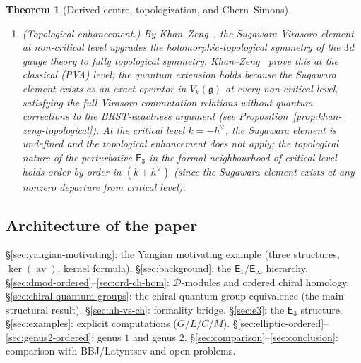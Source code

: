 \documentclass[11pt,reqno]{amsart}
\newtheorem{theorem}{Theorem}[section]
\theoremstyle{definition}
\theoremstyle{remark}
\newcommand{\cD}{\mathcal{D}}
\newcommand{\Eone}{\mathsf{E}_{1}}
\providecommand{\Ethree}{\mathsf{E}_{3}}
\newcommand{\Einf}{\mathsf{E}_{\infty}}
\newcommand{\Pthree}{\mathsf{P}_{3}}
\DeclareMathOperator{\av}{av}
\newcommand{\fg}{\mathfrak{g}}
\numberwithin{equation}{section}
\begin{document}
\begin{theorem}[Derived centre, topologization, and
Chern--Simons]
\begin{enumerate}[label=\textup{(\roman*)}]
  Formal disk restriction matches the affine and CFG
  constructions at the associated-graded and
  $\Pthree$-bracket level. Identifying the full
  deformation families as chain-level
  $\Ethree^{\mathrm{top}}$-algebras remains conjectural.
\item \textup{(Topological enhancement.)}
  By Khan--Zeng~\cite{KhanZeng25}, the Sugawara Virasoro
  element at non-critical level upgrades the
  holomorphic-topological symmetry of the $3$d gauge theory
  to fully topological symmetry.
  Khan--Zeng~\cite{KhanZeng25} prove this at the
  classical \textup{(}PVA\textup{)} level; the quantum
  extension holds because the Sugawara element exists as
  an exact operator in $V_k(\fg)$ at every non-critical
  level, satisfying the full Virasoro commutation relations
  without quantum corrections to the BRST-exactness
  argument \textup{(}see
  Proposition~\ref{prop:khan-zeng-topological}\textup{)}.
  At the critical level $k = -h^\vee$, the
  Sugawara element is undefined and the topological
  enhancement does not apply; the topological nature of
  the perturbative $\Ethree$ in the formal neighbourhood
  of critical level holds
  order-by-order in $(k + h^\vee)$
  \textup{(}since the Sugawara element exists at any
  nonzero departure from critical level\textup{)}.
\end{enumerate}
\end{theorem}

\subsection{Architecture of the paper}

\S\ref{sec:yangian-motivating}: the Yangian motivating
example (three structures, $\ker(\av)$, kernel formula).
\S\ref{sec:background}: the $\Eone/\Einf$ hierarchy.
\S\ref{sec:dmod-ordered}--\ref{sec:ord-ch-hom}: $\cD$-modules
and ordered chiral homology.
\S\ref{sec:chiral-quantum-groups}: the chiral quantum group
equivalence (the main structural result).
\S\ref{sec:hh-vs-ch}: formality bridge.
\S\ref{sec:e3}: the $\Ethree$ structure.
\S\ref{sec:examples}: explicit computations ($G/L/C/M$).
\S\ref{sec:elliptic-ordered}--\ref{sec:genus2-ordered}:
genus $1$ and genus $2$.
\S\ref{sec:comparison}--\ref{sec:conclusion}: comparison
with BBJ/Latyntsev and open problems.

\end{document}
